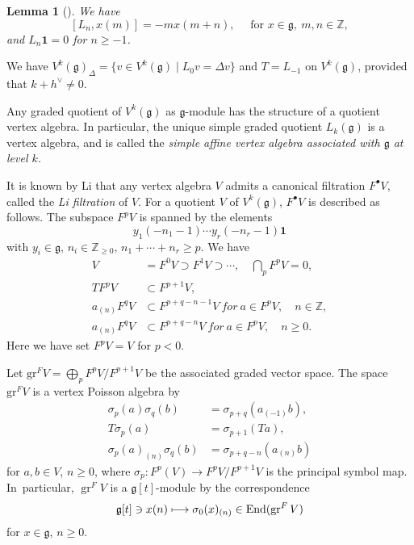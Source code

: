 \documentclass[JEP,XML,SOM,Unicode]{cedram}
\let\oldvee\vee
\renewcommand{\vee}{{\scriptscriptstyle\oldvee}}
\newcommand{\sbullet}{{\scriptscriptstyle\bullet}}
\newcommand\mto{\mathchoice{\longmapsto}{\mapsto}{\mapsto}{\mapsto}}
\let\on\operatorname
\newcommand\Z{{\mathbb Z}}
\DeclareMathOperator{\End}{End}
\newcommand \g{\mathfrak g}
\newcommand \frg{\widehat{\mathfrak{g}}}
\newtheorem{lem}[theorem]{Lemma}
\theoremstyle{definition}
\begin{document}
\begin{lem}[{\cite{Kac_infinite}}]
\label{lem:sugawara-vs-g}
We have
\[
[L_n,x(m)]= - m x(m+n), \quad
\text{ for }x\in \g,\ m,n\in \Z,
\]
and $L_n\mathbf{1}=0$ for $n\geq -1$.
\end{lem}
We have
$V^k(\g) _{\Delta}=\{v\in V^k(\g)\mid L_0 v=\Delta v\}$
and $T=L_{-1}$ on $V^k(\g)$, provided that $k+h^{\vee}\ne 0$.

Any
graded quotient of $V^k(\g)$
as $\frg$-module
has the structure of a quotient vertex algebra.
In particular,
the unique simple graded quotient $L_k(\g)$
is a vertex algebra,
and is called the \emph{simple affine vertex algebra associated with $\g$ at level $k$.}

It is known by Li \cite{Li05}
that any vertex algebra $V$ admits a canonical filtration $F^\sbullet V$,
called the \emph{Li filtration} of $V$.
For a quotient $V$ of $V^k(\g)$,
$F^\sbullet V$ is described as follows.
The subspace
$F^p V$ is spanned by the elements
\[
y_{1}(-n_1-1)\cdots y_{r}(-n_r-1)\mathbf{1}
\]
with $y_{i} \in \g$,
$n_i\in\Z_{\geq 0}$, $ n_1+\cdots +n_r\geq p$.
We have
\begin{equation}
\label{eq:translation}
\begin{aligned}
V&=F^0V\supset F^1V\supset\cdots, \quad \textstyle\bigcap_{p}F^pV=0,\\ 
TF^pV&\subset F^{p+1}V,\\
a_{(n)}F^{q}V&\subset F^{p+q-n-1}V \ for \ a\in F^{p}V, \quad n\in\Z,\\
a_{(n)}F^{q}V&\subset F^{p+q-n}V \ for \ a\in F^{p}V, \quad n\geq 0.
\end{aligned}
\end{equation}
Here we have set $F^pV=V$ for $p<0$.

Let $\mathrm{gr}^FV=\bigoplus_p F^pV/F^{p+1}V$ be the associated graded vector space.
The space $\mathrm{gr}^FV$ is a vertex Poisson algebra by
\begin{align*}
\sigma_{p}(a)\sigma_{q}(b)&=\sigma_{p+q}(a_{(-1)}b),\\
T\sigma_{p}(a)&=\sigma_{p+1}(Ta),\\
\sigma_{p}(a)_{(n)}\sigma_{q}(b)&=\sigma_{p+q- n}(a_{(n)}b)
\end{align*}
for $a,b\in V$,
$n\geq 0$,
where $\sigma_p \colon F^p(V)\to F^pV/F^{p+1}V$ is the principal symbol map.
In~particular,
$\on{gr}^F V$ is a $\g[t]$-module by the correspondence
\begin{equation}
\g[t]\ni x(n)\mto \sigma_0(x)_{(n)}\in \End(\on{gr}^F V)
\label{eq:g[t]-action-in-gr}
\end{equation}
for $x\in \g$, $n\geq 0$.
\end{document}
